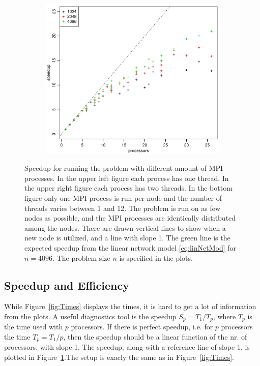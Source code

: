 \begin{figure}[h!]
  \quad
  \begin{subfigure}[b]{0.48\textwidth}
    \includegraphics[width=\textwidth]{./Figures/taskbSpeedupNodesTimesThreads.pdf}
  \end{subfigure}
  \vspace{-0.1\baselineskip}
  \caption{Speedup for running the problem with different amount of MPI processes. In the upper left figure each process has one thread. In the upper right figure each process has two threads. In the bottom figure only one MPI process is run per node and the number of threads varies between 1 and 12. The problem is run on as few nodes as possible, and the MPI processes are identically distributed among the nodes. There are drawn vertical lines to show when a new node is utilized, and a line with slope 1. The green line is the expected speedup from the linear network model \eqref{eq:linNetMod} for $n = 4096$. The problem size $n$ is specified in the plots. }
  \label{fig:Speedup}
\end{figure}
%
\subsection{Speedup and Efficiency}
While Figure~\ref{fig:Times} displays the times, it is hard to get a lot of information from the plots. A useful diagnostics tool is the speedup $S_p=T_1/T_p$, where $T_p$ is the time used with $p$ processors. If there is perfect speedup, i.e. for $p$ processors the time $T_p = T_1/p$, then the speedup should be a linear function of the nr. of processors, with slope 1. The speedup, along with a reference line of slope 1, is plotted in Figure~\ref{fig:Speedup}.The setup is exacly the same as in Figure~\ref{fig:Times}.

